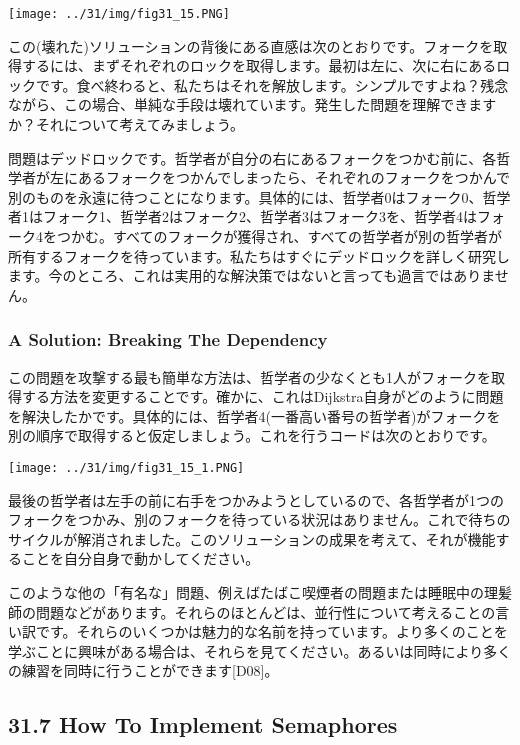 \texttt{[image: ../31/img/fig31\_15.PNG]}

この(壊れた)ソリューションの背後にある直感は次のとおりです。フォークを取得するには、まずそれぞれのロックを取得します。最初は左に、次に右にあるロックです。食べ終わると、私たちはそれを解放します。シンプルですよね？残念ながら、この場合、単純な手段は壊れています。発生した問題を理解できますか？それについて考えてみましょう。

問題はデッドロックです。哲学者が自分の右にあるフォークをつかむ前に、各哲学者が左にあるフォークをつかんでしまったら、それぞれのフォークをつかんで別のものを永遠に待つことになります。具体的には、哲学者0はフォーク0、哲学者1はフォーク1、哲学者2はフォーク2、哲学者3はフォーク3を、哲学者4はフォーク4をつかむ。すべてのフォークが獲得され、すべての哲学者が別の哲学者が所有するフォークを待っています。私たちはすぐにデッドロックを詳しく研究します。今のところ、これは実用的な解決策ではないと言っても過言ではありません。

\hypertarget{a-solution-breaking-the-dependency}{%
\subsubsection*{A Solution: Breaking The
Dependency}\label{a-solution-breaking-the-dependency}}

この問題を攻撃する最も簡単な方法は、哲学者の少なくとも1人がフォークを取得する方法を変更することです。確かに、これはDijkstra自身がどのように問題を解決したかです。具体的には、哲学者4(一番高い番号の哲学者)がフォークを別の順序で取得すると仮定しましょう。これを行うコードは次のとおりです。

\texttt{[image: ../31/img/fig31\_15\_1.PNG]}

最後の哲学者は左手の前に右手をつかみようとしているので、各哲学者が1つのフォークをつかみ、別のフォークを待っている状況はありません。これで待ちのサイクルが解消されました。このソリューションの成果を考えて、それが機能することを自分自身で動かしてください。

このような他の「有名な」問題、例えばたばこ喫煙者の問題または睡眠中の理髪師の問題などがあります。それらのほとんどは、並行性について考えることの言い訳です。それらのいくつかは魅力的な名前を持っています。より多くのことを学ぶことに興味がある場合は、それらを見てください。あるいは同時により多くの練習を同時に行うことができます{[}D08{]}。

\hypertarget{how-to-implement-semaphores}{%
\subsection*{31.7 How To Implement
Semaphores}\label{how-to-implement-semaphores}}

